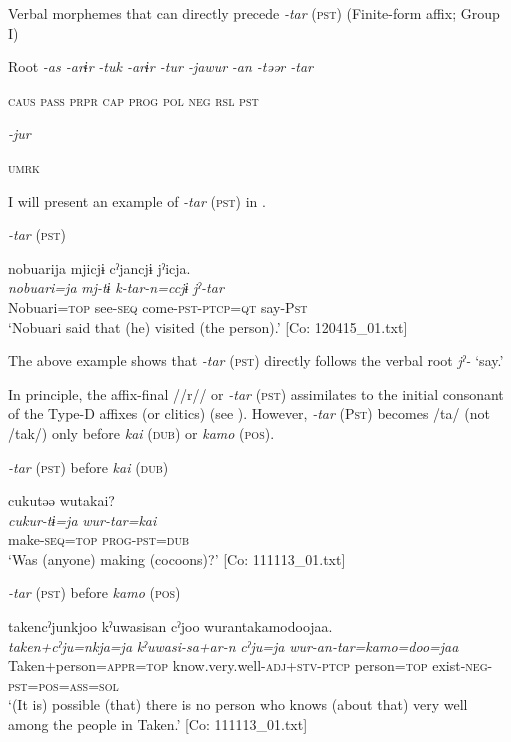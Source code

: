 \ea\label{ex:8-55}
  Verbal morphemes that can directly precede \textit{-tar} (\textsc{pst}) (Finite-form affix; Group I)

  Root  \textit{-as  -arɨr} %
\textit{-tuk  -arɨr  -tur  -jawur} %
\textit{-an  -təər  -tar}

    \textsc{caus}  \textsc{pass}  \textsc{prpr}  \textsc{cap}  \textsc{prog}  \textsc{pol}  \textsc{neg}  \textsc{rsl}  \textsc{pst}

          \textit{-jur}

          \textsc{umrk}
\z

I will present an example of \textit{-tar} (\textsc{pst}) in .

\ea\label{ex:8-56}
  \textit{-tar} (\textsc{pst})

  {\TM}
\glll  nobuarija  mjicjɨ  cˀjancjɨ  jˀicja.\\
\textit{nobuari=ja}  \textit{mj-tɨ}  \textit{k-tar-n=ccjɨ}  \textit{jˀ-tar}\\

    Nobuari=\textsc{top}  see-\textsc{seq}  come-\textsc{pst}-\textsc{ptcp}=\textsc{qt}  say-P\textsc{st}\\
\glt ‘Nobuari said that (he) visited (the person).’ [Co: 120415\_01.txt]
\z

The above example shows that \textit{-tar} (\textsc{pst}) directly follows the verbal root \textit{jˀ-} ‘say.’

In principle, the affix-final //r// or \textit{-tar} (\textsc{pst}) assimilates to the initial consonant of the Type-D affixes (or clitics) (see ). However, \textit{-tar} (P\textsc{st}) becomes /ta/ (not /tak/) only before \textit{kai} (\textsc{dub}) or \textit{kamo} (\textsc{pos}).

\ea\label{ex:8-57}
\ea \textit{-tar} (\textsc{pst}) before \textit{kai} (\textsc{dub})

  {\TM}
\glll  cukutəə  wutakai?\\
\textit{cukur-tɨ=ja}  \textit{wur-tar=kai}\\

    make-\textsc{seq}=\textsc{top}  \textsc{prog}-\textsc{pst}=\textsc{dub}\\
\glt ‘Was (anyone) making (cocoons)?’ [Co: 111113\_01.txt]


\ex \textit{-tar} (\textsc{pst}) before \textit{kamo} (\textsc{pos})

  {\TM}
\glll  takencˀjunkjoo  kˀuwasisan  cˀjoo    wurantakamodoojaa.\\
\textit{taken+cˀju=nkja=ja}  \textit{kˀuwasi-sa+ar-n}  \textit{cˀju=ja}    \textit{wur-an-tar=kamo=doo=jaa}\\
    Taken+person=\textsc{appr}=\textsc{top}  know.very.well-\textsc{adj}+\textsc{stv}-\textsc{ptcp}  person=\textsc{top}  exist-\textsc{neg}-\textsc{pst}=\textsc{pos}=\textsc{ass}=\textsc{sol}\\
\glt ‘(It is) possible (that) there is no person who knows (about that) very well among the people in Taken.’ [Co: 111113\_01.txt]
\z
\z

